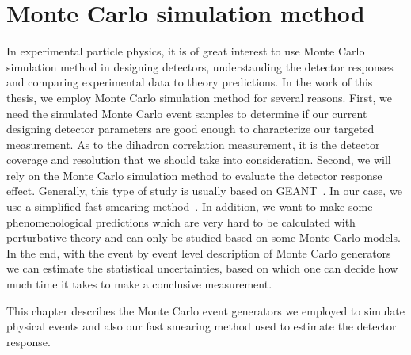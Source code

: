 \chapter{Monte Carlo simulation method} \label{chp:MC}

In experimental particle physics, it is of great interest to use Monte Carlo
simulation method in designing detectors, understanding the detector responses
and comparing experimental data to theory predictions. In the work of this
thesis, we employ Monte Carlo simulation method for several reasons. First, we
need the simulated Monte Carlo event samples to determine if our current
designing detector parameters are good enough to characterize our targeted
measurement. As to the dihadron correlation measurement, it is the detector
coverage and resolution that we should take into consideration. Second, we will
rely on the Monte Carlo simulation method to evaluate the detector response
effect. Generally, this type of study is usually based on
GEANT~\cite{Brun:1978fy}. In our case, we use a simplified fast smearing method~\cite{EICsmear}.
In addition, we want to make some phenomenological predictions which are very
hard to be calculated with perturbative theory and can only be studied based on
some Monte Carlo models. In the end, with the event by event level description
of Monte Carlo generators we can estimate the statistical uncertainties, based on which
one can decide how much time it takes to make a conclusive measurement.

This chapter describes the Monte Carlo event generators we employed to simulate
physical events and also our fast smearing method used to estimate the detector response.


